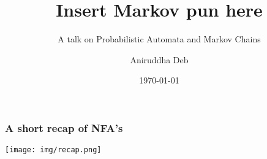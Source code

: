 \documentclass{beamer}
\title{Insert Markov pun here}
\subtitle{A talk on Probabilistic Automata and Markov Chains}
\author{Aniruddha Deb}
\institute{IIT Delhi}
\date{\today}
\begin{document}
\begin{frame}
\titlepage
\end{frame}

\begin{frame}
\frametitle{A short recap of NFA's}

\begin{center}
\texttt{[image: img/recap.png]}
\end{center}

\end{frame}
\end{document}
